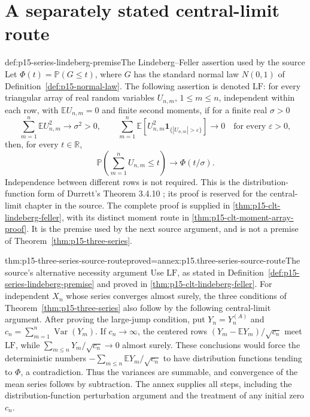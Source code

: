 \section{A separately stated central-limit route}
\label{sec:p15-series-lindeberg-route}

\begin{hbdefinition}{def:p15-series-lindeberg-premise}{The Lindeberg--Feller assertion used by the source}
Let \(\Phi(t)=\mathbb P(G\leq t)\), where \(G\) has the standard
normal law \(N(0,1)\) of Definition~\ref{def:p15-normal-law}.
The following assertion is denoted \(\mathrm{LF}\):
for every triangular array of real random variables
\(U_{n,m}\), \(1\leq m\leq n\), independent within each row,
with \(\mathbb EU_{n,m}=0\) and finite second moments, if for a
finite real \(\sigma>0\)
\[
 \sum_{m=1}^n\mathbb EU_{n,m}^2\longrightarrow\sigma^2>0,
 \qquad
 \sum_{m=1}^n
 \mathbb E\!\left[U_{n,m}^2\mathbf1_{\{|U_{n,m}|>\varepsilon\}}\right]
       \longrightarrow0\quad\text{for every }\varepsilon>0,
\]
then, for every \(t\in\mathbb R\),
\[
 \mathbb P\!\left(\sum_{m=1}^nU_{n,m}\leq t\right)
                   \longrightarrow\Phi(t/\sigma).
\]
Independence between different rows is not required. This is the
distribution-function form of Durrett's Theorem 3.4.10
\cite[pp.~148--149]{DurrettPTEAuthor2019}; its proof is reserved for
the central-limit chapter in the source. The complete proof is supplied
in \cref{thm:p15-clt-lindeberg-feller}, with its distinct moment route
in \cref{thm:p15-clt-moment-array-proof}.
It is the premise used by the next source argument, and is not a premise of
Theorem~\ref{thm:p15-three-series}.
\end{hbdefinition}

\begin{hbtheorem}{thm:p15-three-series-source-route}{proved=annex:p15.three-series-source-route}{The source's alternative necessity argument}
Use \(\mathrm{LF}\), as stated in
Definition~\ref{def:p15-series-lindeberg-premise} and proved in
\cref{thm:p15-clt-lindeberg-feller}.
For independent \(X_n\) whose series converges almost surely, the
three conditions of Theorem~\ref{thm:p15-three-series} also follow
by the following central-limit argument. After proving the large-jump
condition, put \(Y_n=Y_n^{(A)}\) and
\(c_n=\sum_{m=1}^n\operatorname{Var}(Y_m)\).
If \(c_n\to\infty\), the centered rows
\((Y_m-\mathbb EY_m)/\sqrt{c_n}\) meet \(\mathrm{LF}\), while
\(\sum_{m\leq n}Y_m/\sqrt{c_n}\to0\) almost surely.
These conclusions would force the deterministic numbers
\(-\sum_{m\leq n}\mathbb EY_m/\sqrt{c_n}\) to have distribution
functions tending to \(\Phi\), a contradiction. Thus the variances
are summable, and convergence of the mean series follows by subtraction.
The annex supplies all steps, including the distribution-function
perturbation argument and the treatment of any initial zero \(c_n\).
\end{hbtheorem}

